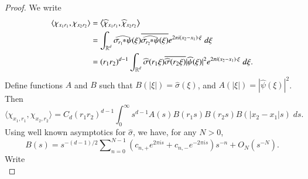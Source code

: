 
\begin{proof}
%
    We write
    \begin{equation}
    \begin{split}
        \langle \chi_{x_1 r_1}, \chi_{x_2 r_2} \rangle &= \left\langle \widehat{\chi}_{x_1 r_1}, \widehat{\chi}_{x_2 r_2} \right\rangle\\
        &= \int_{\RR^d} \widehat{\sigma_{\! r_1}\!\! *\! \psi}(\xi) \overline{\widehat{\sigma_{\! r_2}\!\! * \! \psi}(\xi)} e^{2 \pi i (x_2 - x_1) \cdot \xi}\; d\xi\\
        &= (r_1 r_2)^{d-1} \int_{\RR^d} \widehat{\sigma}(r_1 \xi) \overline{\widehat{\sigma}(r_2 \xi)} |\widehat{\psi}(\xi)|^2 e^{2 \pi i (x_2 - x_1) \cdot \xi}\; d\xi.
    \end{split}
    \end{equation}
    Define functions $A$ and $B$ such that $B(|\xi|) = \widehat{\sigma}(\xi)$, and $A(|\xi|) = |\widehat{\psi}(\xi)|^2$. Then
    \begin{equation}
      \langle \chi_{x_1, r_1}, \chi_{x_2, r_2} \rangle = C_d (r_1r_2)^{d-1} \int_0^\infty s^{d-1} A(s) B(r_1 s) B(r_2 s) B(|x_2 - x_1| s)\; ds.
    \end{equation}
    Using well known asymptotics for $\widehat{\sigma}$, we have, for any $N > 0$,
    \begin{equation}
      B(s) = s^{-(d-1)/2} \sum\nolimits_{n = 0}^{N-1} (c_{n,+} e^{2 \pi i s} + c_{n,-} e^{-2 \pi i s}) s^{-n} + O_N(s^{-N}).
    \end{equation}
    Write
    \begin{equation}

\end{equation}
\end{proof}
